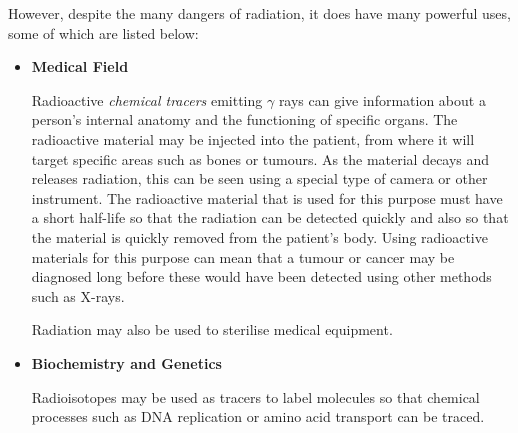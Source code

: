 However, despite the many dangers of radiation, it does have many powerful uses, some of which are listed below:

\begin{itemize}
\item{\textbf{Medical Field}}

Radioactive \textit{chemical tracers} emitting $\gamma$ rays can give information about a person's internal anatomy and the functioning of specific organs. The radioactive material may be injected into the patient, from where it will target specific areas such as bones or tumours. As the material decays and releases radiation, this can be seen using a special type of camera or other instrument. The radioactive material that is used for this purpose must have a short half-life so that the radiation can be detected quickly and also so that the material is quickly removed from the patient's body.
Using radioactive materials for this purpose can mean that a tumour or cancer may be diagnosed long before these would have been detected using other methods such as X-rays.

Radiation may also be used to sterilise medical equipment.


\item{\textbf{Biochemistry and Genetics}}

Radioisotopes may be used as tracers to label molecules so that chemical processes such as DNA replication or amino acid transport can be traced.


\end{itemize}
